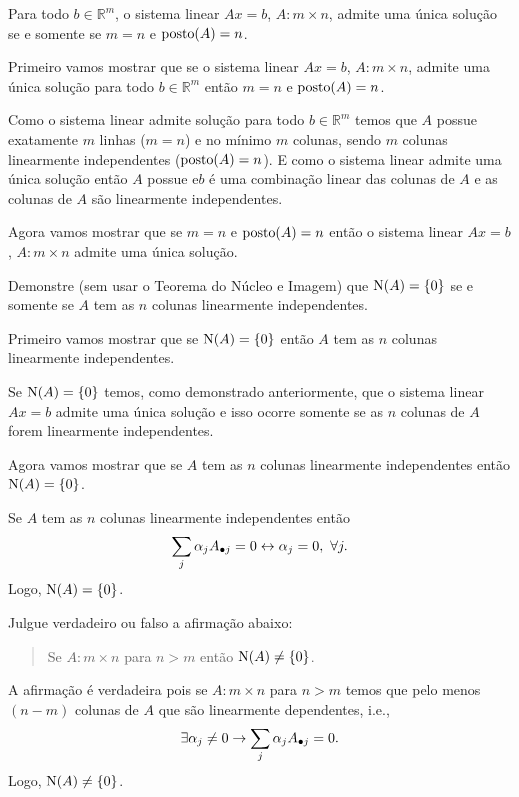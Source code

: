 \begin{questions}
    \question Para todo $b \in \mathbb{R}^m$, o sistema linear $A x = b$, $A : m \times n$, admite uma \'{u}nica solu\c{c}\~{a}o se e somente se $m = n$ e $\text{posto} (A) = n$.
    \begin{solution}
        Primeiro vamos mostrar que se o sistema linear $A x = b$, $A: m \times n$, admite uma \'{u}nica solu\c{c}\~{a}o para todo $b \in \mathbb{R}^m$ ent\~{a}o $m = n$ e $\text{posto} (A) = n$.

        Como o sistema linear admite solu\c{c}\~{a}o para todo $b \in \mathbb{R}^m$ temos que $A$ possue exatamente $m$ linhas ($m = n$) e no m\'{i}nimo $m$ colunas, sendo $m$ colunas linearmente independentes ($\text{posto} (A) = n$). E como o sistema linear admite uma \'{u}nica solu\c{c}\~{a}o ent\~{a}o $A$ possue e$b$ \'{e} uma combina\c{c}\~{a}o linear das colunas de $A$ e as colunas de $A$ s\~{a}o linearmente independentes. 

        Agora vamos mostrar que se $m = n$ e $\text{posto} (A) = n$ ent\~{a}o o sistema linear $A x = b$, $A: m \times n$ admite uma \'{u}nica solu\c{c}\~{a}o.
        
    \end{solution}

    \question Demonstre (sem usar o Teorema do N\'{u}cleo e Imagem) que $\text{N} (A) = \left\{ 0 \right\}$ se e somente se $A$ tem as $n$ colunas linearmente independentes.
    \begin{solution}
        Primeiro vamos mostrar que se $\text{N} (A) = \left\{ 0 \right\}$ ent\~{a}o $A$ tem as $n$ colunas linearmente independentes.

        Se $\text{N} (A) = \left\{ 0 \right\}$ temos, como demonstrado anteriormente, que o sistema linear $A x = b$ admite uma \'{u}nica solu\c{c}\~{a}o e isso ocorre somente se as $n$ colunas de $A$ forem linearmente independentes.

        Agora vamos mostrar que se $A$ tem as $n$ colunas linearmente independentes ent\~{a}o $\text{N} (A) = \left\{ 0 \right\}$.

        Se $A$ tem as $n$ colunas linearmente independentes ent\~{a}o
        \[
        \sum_j \alpha_j A_{\bullet j} = 0 \leftrightarrow \alpha_j = 0, \  \forall j.
        \]
        Logo, $\text{N} (A) = \left\{ 0 \right\}$.
    \end{solution}

    \question Julgue verdadeiro ou falso a afirma\c{c}\~{a}o abaixo:
    \begin{quote}
        Se $A: m \times n$ para $n > m$ ent\~{a}o $\text{N} (A) \neq \left\{ 0 \right\}$.
    \end{quote}
    \begin{solution}
        A afirma\c{c}\~{a}o \'{e} verdadeira pois se $A: m \times n$ para $n > m$ temos que pelo menos $\left( n - m \right)$ colunas de $A$ que s\~{a}o linearmente dependentes, i.e.,
        \[
        \exists \alpha_j \neq 0 \rightarrow \sum_j \alpha_j A_{\bullet j} = 0.
        \]
        Logo, $\text{N} (A) \neq \left\{ 0 \right\}$.
    \end{solution}


\end{questions}
